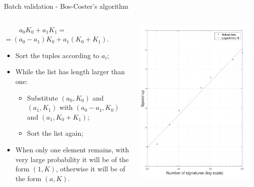\documentclass[slidescentered]{beamer}
\begin{document}
	\begin{frame}{Batch validation - Bos-Coster's algorithm}
		\begin{columns}
			\begin{column}{0.5\linewidth}
				$\ \ \ \ \ \ \ \ \ \ a_0K_0 + a_1K_1 =$ \\ $= (a_0 - a_1)K_0 + a_1(K_0 + K_1)$.
				
				\bigskip
				
				\pause
				\begin{itemize}
					\item<2 -> Sort the tuples according to $a_i$;
					\item<3 -> While the list has length larger than one:
					\begin{itemize}
						\item<4 ->Substitute $(a_0, K_0)$ and $(a_1, K_1)$ with $(a_0 - a_1, K_0)$ and $(a_1, K_0 + K_1)$;
						\item<5 -> Sort the list again;
					\end{itemize}
					\item<6 -> When only one element remains, with very large probability it will be of the form $(1, K)$, otherwise it will be of the form $(a, K)$.
				\end{itemize}
			\end{column}
			\begin{column}{0.5\linewidth}
				\hspace*{0cm}
				\includegraphics[scale=0.31]{images/speedup}
			\end{column}
		\end{columns}
	\end{frame}
\end{document}
